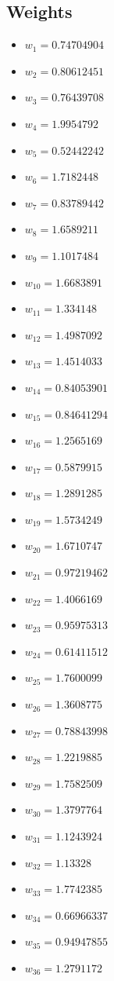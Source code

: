 \documentclass[11pt]{article}
\begin{document}
\subsection*{Weights}
\begin{itemize}
\item $w_{1} = 0.74704904$
\item $w_{2} = 0.80612451$
\item $w_{3} = 0.76439708$
\item $w_{4} = 1.9954792$
\item $w_{5} = 0.52442242$
\item $w_{6} = 1.7182448$
\item $w_{7} = 0.83789442$
\item $w_{8} = 1.6589211$
\item $w_{9} = 1.1017484$
\item $w_{10} = 1.6683891$
\item $w_{11} = 1.334148$
\item $w_{12} = 1.4987092$
\item $w_{13} = 1.4514033$
\item $w_{14} = 0.84053901$
\item $w_{15} = 0.84641294$
\item $w_{16} = 1.2565169$
\item $w_{17} = 0.5879915$
\item $w_{18} = 1.2891285$
\item $w_{19} = 1.5734249$
\item $w_{20} = 1.6710747$
\item $w_{21} = 0.97219462$
\item $w_{22} = 1.4066169$
\item $w_{23} = 0.95975313$
\item $w_{24} = 0.61411512$
\item $w_{25} = 1.7600099$
\item $w_{26} = 1.3608775$
\item $w_{27} = 0.78843998$
\item $w_{28} = 1.2219885$
\item $w_{29} = 1.7582509$
\item $w_{30} = 1.3797764$
\item $w_{31} = 1.1243924$
\item $w_{32} = 1.13328$
\item $w_{33} = 1.7742385$
\item $w_{34} = 0.66966337$
\item $w_{35} = 0.94947855$
\item $w_{36} = 1.2791172$

\end{itemize}
\end{document}
